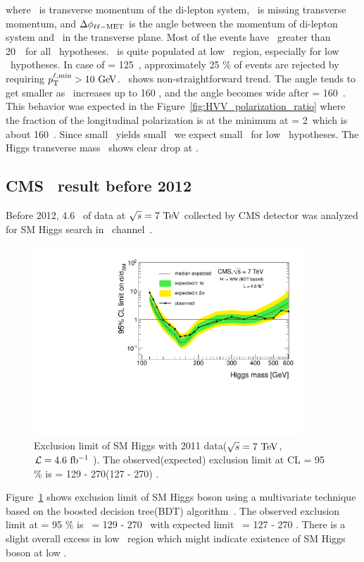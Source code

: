 where \ptll\ is transverse momentum of the di-lepton system, 
\met\ is missing transverse momentum, and  
$\Delta\phi_{\ell\ell-\mathrm{MET}}$ is the angle between the momentum of di-lepton
system and \met\ in the transverse plane.
Most of the events have \ptlmax\ greater than 20~\GeV\ for all \mHi\ hypotheses. 
\ptlmin\ is quite populated at low \ptlmin\ region, especially for low \mHi\ 
hypotheses. In case of \mHi = 125~\GeV, approximately 25 \% of 
events are rejected by requiring $p_{\mathrm{T}}^{\ell,\mathrm{min}}>10~\mathrm{Ge\kern -0.1em V}$. 
\delphill\ shows non-straightforward trend. The angle tends to get smaller 
as \mHi\ increases up to 160 \GeV, and the angle becomes wide 
after \mHi = 160~\GeV. This behavior was expected in the 
Figure~\ref{fig:HVV_polarization_ratio} where the fraction of the 
longitudinal polarization is at the minimum at \mHi = 2\mW\ which is about 160~\GeV. 
Since small \delphill\ yields small \mll\, we expect small \mll\ 
for low \mHi\ hypotheses. The Higgs transverse mass \mT\ shows clear 
drop at \mHi. 

%
\subsection{CMS \hww\ result before 2012}

Before 2012, 4.6 \ifb\ of data at $\sqrt{s}=7~\mathrm{Te\kern -0.1em V}$ collected by CMS detector 
was analyzed for SM Higgs search in \hww\ channel~\cite{Chatrchyan201291}. 
\begin{figure}
\centering
\includegraphics[width=0.9\textwidth]{figures/limits_nj_shape.pdf}
\caption{ Exclusion limit of SM Higgs with 2011 data($\sqrt{s}=7~\mathrm{Te\kern -0.1em V}$, $\mathcal{L}=4.6~\mathrm{fb^{-1}}$ ).
The observed(expected) exclusion limit at CL  = 95 \% is \mHi = 129 - 270(127 - 270) \GeV.}
\label{fig:hww2011}
\end{figure}
Figure~\ref{fig:hww2011} shows exclusion limit of SM Higgs boson 
using a multivariate technique based on the boosted decision tree(BDT) algorithm~\cite{}.
The observed exclusion limit at \CLs  = 95 \% is \mHi\ = 129 - 270 \GeV\
with expected limit \mHi\ = 127 - 270 \GeV. There is a slight overall excess 
in low \mHi\ region which might indicate existence of SM Higgs boson at low \mHi.  

